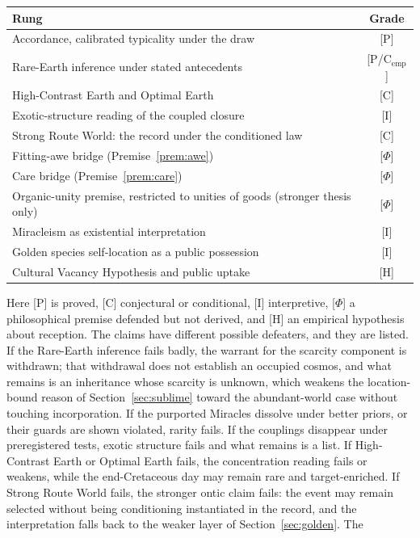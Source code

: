 \begin{center}\small
\begin{tabular}{@{}lc@{}}
\toprule
Rung & Grade\\
\midrule
Accordance, calibrated typicality under the draw & [P]\\
Rare-Earth inference under stated antecedents & [P/C$_{\mathrm{emp}}$]\\
High-Contrast Earth and Optimal Earth & [C]\\
Exotic-structure reading of the coupled closure & [I]\\
Strong Route World: the record under the conditioned law & [C]\\
Fitting-awe bridge (Premise~\ref{prem:awe}) & [$\Phi$]\\
Care bridge (Premise~\ref{prem:care}) & [$\Phi$]\\
Organic-unity premise, restricted to unities of goods (stronger thesis only) & [$\Phi$]\\
Miracleism as existential interpretation & [I]\\
Golden species self-location as a public possession & [I]\\
Cultural Vacancy Hypothesis and public uptake & [H]\\
\bottomrule
\end{tabular}
\end{center}
\noindent Here [P] is proved, [C] conjectural or conditional, [I]
interpretive, [$\Phi$] a philosophical premise defended but not derived, and
[H] an empirical hypothesis about reception. The claims have different
possible defeaters, and they are listed. If the Rare-Earth inference fails
badly, the warrant for the scarcity component is withdrawn; that withdrawal
does not establish an occupied cosmos, and what remains is an inheritance
whose scarcity is unknown, which weakens the location-bound reason of
Section~\ref{sec:sublime} toward the abundant-world case without touching
incorporation. If the purported Miracles dissolve under better priors, or
their guards are shown violated, rarity fails. If the couplings disappear
under preregistered tests, exotic structure fails and what remains is a list.
If High-Contrast Earth or Optimal Earth fails, the concentration reading fails
or weakens, while the end-Cretaceous day may remain rare and target-enriched.
If Strong Route World fails, the stronger ontic claim fails: the event may
remain selected without being conditioning instantiated in the record, and the
interpretation falls back to the weaker layer of Section~\ref{sec:golden}. The

